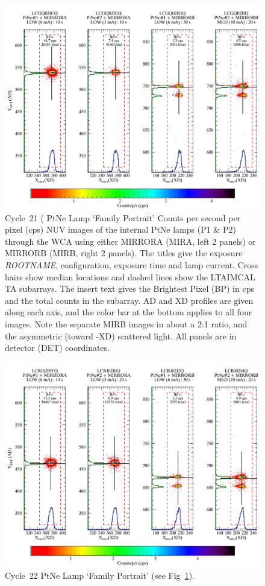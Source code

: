 \begin{figure}[htb]
\noindent\includegraphics[width=0.7\linewidth]{png/C21_13526_FP.png}
\caption[C21 WCA Lamp `Family Portrait']{Cycle~21 ( PtNe Lamp `Family Portrait'
Counts per second per pixel (cps) NUV images of the internal PtNe lamps (P1 \& P2) through the
WCA using either MIRRORA (MIRA, left 2 panels) or MIRRORB (MIRB, right 2 panels). The titles
give the exposure \textit{ROOTNAME}, configuration, exposure time and lamp current. Cross hairs show median locations and dashed
lines show the \textsc{LTAIMCAL} TA subarrays.
The insert text gives the Brightest Pixel (BP) in cps and the total counts in the subarray.
AD and XD profiles are given along each axis, and the color bar at the
bottom applies to all four images. Note the separate MIRB images in about a 2:1 ratio, and the asymmetric
(toward -XD) scattered light. All panels are in detector (DET) coordinates.\label{fig:FG21}}
\end{figure}
\begin{center}
	\begin{figure}[htb]
	\noindent\includegraphics*[width=0.75\linewidth]{png/C22_13972_FP.png}
	\caption[C22 WCA Lamp `Family Portrait']{Cycle~22 PtNe Lamp `Family Portrait' (see Fig~\ref{fig:FG21}). \label{fig:FG22}}
	\end{figure}
\end{center}
